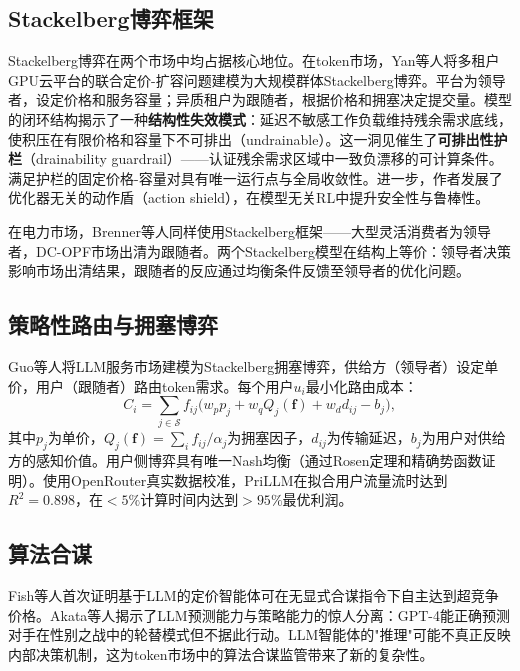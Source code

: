 \documentclass[11pt,twocolumn]{article}
\begin{document}
\subsection{Stackelberg博弈框架}

Stackelberg博弈在两个市场中均占据核心地位。在token市场，Yan等人\cite{yan2026stackelberg}将多租户GPU云平台的联合定价-扩容问题建模为大规模群体Stackelberg博弈。平台为领导者，设定价格和服务容量；异质租户为跟随者，根据价格和拥塞决定提交量。模型的闭环结构揭示了一种\textbf{结构性失效模式}：延迟不敏感工作负载维持残余需求底线，使积压在有限价格和容量下不可排出（undrainable）。这一洞见催生了\textbf{可排出性护栏}（drainability guardrail）——认证残余需求区域中一致负漂移的可计算条件。满足护栏的固定价格-容量对具有唯一运行点与全局收敛性。进一步，作者发展了优化器无关的动作盾（action shield），在模型无关RL中提升安全性与鲁棒性。

在电力市场，Brenner等人\cite{brenner2026spatial}同样使用Stackelberg框架——大型灵活消费者为领导者，DC-OPF市场出清为跟随者。两个Stackelberg模型在结构上等价：领导者决策影响市场出清结果，跟随者的反应通过均衡条件反馈至领导者的优化问题。

\subsection{策略性路由与拥塞博弈}

Guo等人\cite{guo2025prilm}将LLM服务市场建模为Stackelberg拥塞博弈，供给方（领导者）设定单价，用户（跟随者）路由token需求。每个用户$u_i$最小化路由成本：
\begin{equation}
C_i = \sum_{j \in \mathcal{S}} f_{ij}\bigl(w_p p_j + w_q Q_j(\mathbf{f}) + w_d d_{ij} - b_j\bigr),
\label{eq:prilm_cost}
\end{equation}
其中$p_j$为单价，$Q_j(\mathbf{f}) = \sum_i f_{ij}/\alpha_j$为拥塞因子，$d_{ij}$为传输延迟，$b_j$为用户对供给方的感知价值。用户侧博弈具有唯一Nash均衡（通过Rosen定理和精确势函数证明）。使用OpenRouter真实数据校准，PriLLM在拟合用户流量流时达到$R^2 = 0.898$，在$<5\%$计算时间内达到$>95\%$最优利润。

\subsection{算法合谋}

Fish等人\cite{fish2024algorithmic}首次证明基于LLM的定价智能体可在无显式合谋指令下自主达到超竞争价格。Akata等人\cite{akata2025playing}揭示了LLM预测能力与策略能力的惊人分离：GPT-4能正确预测对手在性别之战中的轮替模式但不据此行动。LLM智能体的"推理"可能不真正反映内部决策机制，这为token市场中的算法合谋监管带来了新的复杂性。
\end{document}
